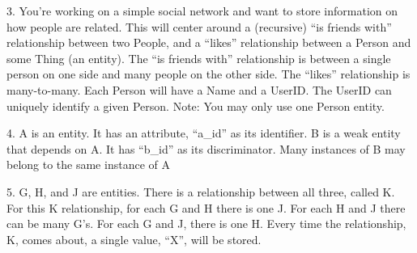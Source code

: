 \documentclass{report}
\begin{document}
\pagebreak \bigbreak \noindent 
\begin{mdframed}
    3. You’re working on a simple social network and want to store information on how people are related. This will center around a (recursive) “is friends
with” relationship between two People, and a “likes” relationship between a Person and some Thing (an entity). The “is friends with” relationship
is between a single person on one side and many people on the other side. The “likes” relationship is many-to-many. Each Person will have a Name
and a UserID. The UserID can uniquely identify a given Person. Note: You may only use one Person entity.
\end{mdframed}
\begin{figure}[ht]
    \centering
    \label{fig:3}
\end{figure}

\bigbreak \noindent 
\begin{mdframed}
    4. A is an entity. It has an attribute, “a\_id” as its identifier. B is a weak entity that depends on A. It has “b\_id” as its discriminator. Many instances of
B may belong to the same instance of A
\end{mdframed}
\bigbreak \noindent 
\begin{figure}[ht]
    \centering
    \label{fig:5}
\end{figure}

\pagebreak 
\bigbreak \noindent 
\begin{mdframed}
    5. G, H, and J are entities. There is a relationship between all three, called K. For this K relationship, for each G and H there is one J. For each H and
J there can be many G’s. For each G and J, there is one H. Every time the relationship, K, comes about, a single value, “X”, will be stored.
\end{mdframed}
\begin{figure}[ht]
    \centering
    \label{fig:6}
\end{figure}

    
\end{document}

